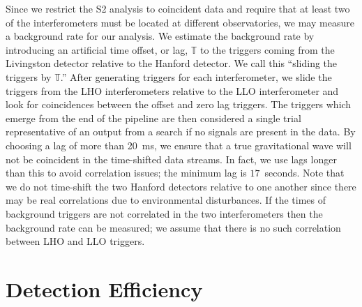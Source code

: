 Since we restrict the S2 analysis to coincident data and require that at least
two of the interferometers must be located at different observatories, we may
measure a background rate for our analysis.  We estimate the background rate
by introducing an artificial time offset, or {lag}, $\mathbb{T}$ to the
triggers coming from the Livingston detector relative to the Hanford detector.
We call this ``sliding the triggers by $\mathbb{T}$.'' After generating
triggers for each interferometer, we slide the triggers from the LHO
interferometers relative to the LLO interferometer and look for coincidences
between the offset and zero lag triggers.  The triggers which emerge from the
end of the pipeline are then considered a single trial representative of an
output from a search if no signals are present in the data.   By choosing a
lag of more than 20~ms, we ensure that a true gravitational wave will not be
coincident in the time-shifted data streams.  In fact, we use lags longer than
this to avoid correlation issues; the minimum lag is $17$~seconds.  Note that we do
not time-shift the two Hanford detectors relative to one another since there
may be real correlations due to environmental disturbances.  If the times of
background triggers are not correlated in the two interferometers then the
background rate can be measured; we assume that there is no such correlation
between LHO and LLO triggers.

\section{Detection Efficiency}
\label{s:eff}

